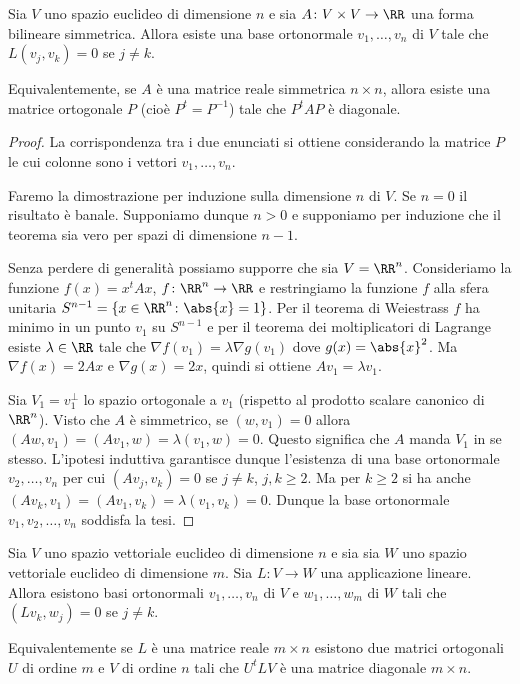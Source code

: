 \begin{theorem}
Sia $V$ uno spazio euclideo di dimensione $n$ e sia 
$A\colon V\times V \to \RR$ 
una forma bilineare simmetrica.
Allora esiste una base ortonormale $v_1,\dots,v_n$ di $V$
tale che $L(v_j,v_k) = 0$ se $j\neq k$. 

Equivalentemente, se $A$ è una matrice reale simmetrica $n\times n$,
allora esiste una matrice ortogonale $P$ (cioè $P^t=P^{-1}$) tale che
$P^t A P$ è diagonale.
\end{theorem}
%
\begin{proof}
La corrispondenza tra i due enunciati si ottiene 
considerando la matrice $P$ le cui colonne sono i vettori
$v_1,\dots,v_n$.

Faremo la dimostrazione per induzione sulla dimensione $n$ di $V$.
Se $n=0$ il risultato è banale. 
Supponiamo dunque $n>0$ e supponiamo per induzione che il teorema sia vero
per spazi di dimensione $n-1$.

Senza perdere di generalità possiamo supporre che sia $V = \RR^n$.
Consideriamo la funzione $f(x) = x^t A x$, $f\colon \RR^n\to \RR$ e restringiamo 
la funzione $f$ alla sfera unitaria $S^{n-1} = \{ x \in \RR^n \colon \abs{x} = 1\}$.
Per il teorema di Weiestrass $f$ ha minimo in un punto $v_1$ su $S^{n-1}$ 
e per il teorema dei moltiplicatori di Lagrange
esiste $\lambda \in \RR$ tale che $\nabla f(v_1) = \lambda \nabla g(v_1)$
dove $g(x) = \abs{x}^2$. Ma $\nabla f(x) = 2 A x$ e $\nabla g(x) = 2 x$, quindi si ottiene
$A v_1 = \lambda v_1$.

Sia $V_1 = v_1^\perp$ lo spazio ortogonale a $v_1$ (rispetto al prodotto scalare canonico di $\RR^n$).
Visto che $A$ è simmetrico, se $(w,v_1)=0$ allora 
$(Aw,v_1) = (Av_1,w) = \lambda (v_1,w) = 0$.
Questo significa che $A$ manda $V_1$ in se stesso.
L'ipotesi induttiva garantisce dunque l'esistenza di una base ortonormale 
$v_2,\dots,v_n$ per cui $(Av_j,v_k) = 0$ se $j\neq k$, $j,k\ge 2$.
Ma per $k\ge 2$ si ha anche $(Av_k,v_1) = (Av_1,v_k) = \lambda (v_1,v_k) = 0$.
Dunque la base ortonormale $v_1, v_2,\dots,v_n$ soddisfa la tesi.
\end{proof}


\begin{theorem}
  \label{th:decomposizione_singolare}
Sia $V$ uno spazio vettoriale euclideo di dimensione $n$ e sia
sia $W$ uno spazio vettoriale euclideo di dimensione $m$.
Sia $L\colon V\to W$ una applicazione lineare.
Allora esistono basi ortonormali $v_1,\dots,v_n$ di $V$ e 
$w_1,\dots,w_m$ di $W$ tali che $(L v_k,w_j) = 0$ se $j\neq k$.

Equivalentemente se $L$ è una matrice reale $m\times n$ esistono 
due matrici ortogonali $U$ di ordine $m$ e $V$ di ordine $n$ tali che
$ U^t L V$ è una matrice diagonale $m\times n$.
\end{theorem}

